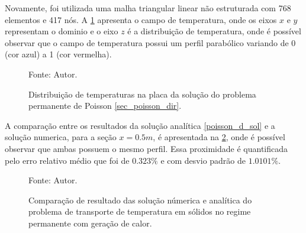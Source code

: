 Novamente, foi utilizada uma malha triangular linear não estruturada com 768 elementos e 417 nós.
A \ref{poisson_d_3d} apresenta o campo de temperatura, onde os eixos $x$ e $y$ representam o dominio e o eixo $z$ é a distribuição de temperatura, onde é possível observar que o campo de temperatura possui um perfil parabólico variando de 0 (cor azul) a 1 (cor vermelha).
\begin{figure}[H]
    \centering
     {\raggedleft \scriptsize Fonte: Autor.}
    \caption{Distribuição de temperaturas na placa da solução do problema permanente de Poisson \ref{sec_poisson_dir}.}
    \label{poisson_d_3d}
\end{figure}

A comparação entre os resultados da solução analítica \eqref{poisson_d_sol} e a solução numerica, para a seção $x=0.5m$, é apresentada na \ref{poisson_d_perm_comp}, onde é possível observar que ambas possuem o mesmo perfil.
Essa proximidade é quantificada pelo erro relativo médio que foi de $0.323\%$ e com desvio padrão de $1.0101\%$.
\begin{figure}[H]
    \centering
     {\raggedleft \scriptsize Fonte: Autor.}
    \caption{Comparação de resultado das solução númerica e analítica do problema de transporte de temperatura em sólidos no regime permanente com geração de calor.}
    \label{poisson_d_perm_comp}
\end{figure}

